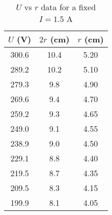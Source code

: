 \begin{table}[H]
\centering
\begin{tabular}{|c|c|c|} \hline
    $U$ (V)& $2r$ (cm) & $r$ (cm)  \\ \hline
    300.6 & 10.4 & 5.20  \\
    289.2 & 10.2 & 5.10  \\
    279.3 &  9.8 & 4.90  \\
    269.6 &  9.4 & 4.70  \\
    259.2 &  9.3 & 4.65 \\
    249.0   &  9.1 & 4.55 \\
    238.9 &  9.0   & 4.50  \\
    229.1 &  8.8 & 4.40  \\
    219.5 &  8.7 & 4.35 \\
    209.5 &  8.3 & 4.15 \\
    199.9 &  8.1 & 4.05 \\
    \hline
    \end{tabular}    
    \caption{$U$ vs $r$ data for a fixed $I=1.5$ A}
    \label{tab:4}
\end{table}